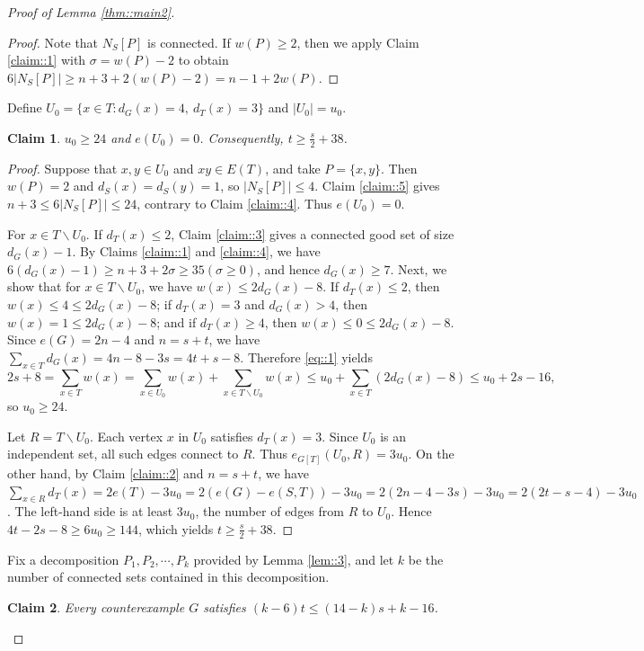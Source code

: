 \documentclass[11pt]{article}
\newtheorem{claim}{Claim}
\theoremstyle{definition}
\begin{document}
\begin{proof}[Proof of Lemma \ref{thm::main2}]
\begin{proof}
    Note that $N_S[P]$ is connected. If $w(P)\geq 2$, then we apply Claim \ref{claim::1} with $\sigma=w(P)-2$ to obtain $6|N_S[P]|\geq n+3+2(w(P)-2)=n-1+2w(P)$.
  \end{proof}

  Define $U_0=\{x\in T:d_G(x)=4,\ d_T(x)=3\}$ and $|U_0|=u_0$.

  \begin{claim}\label{claim::6}
    $u_0\geq 24$ and $e(U_0)=0$.  Consequently, $t\geq \frac{s}{2}+38$.
  \end{claim}


  \begin{proof}
    Suppose that $x,y\in U_0$ and $xy\in E(T)$, and take $P=\{x,y\}$. Then $w(P)=2$ and $d_S(x)=d_S(y)=1$, so $|N_S[P]|\leq 4$. Claim \ref{claim::5} gives $n+3\leq 6|N_S[P]|\leq 24$, contrary to Claim \ref{claim::4}. Thus $e(U_0)=0$.

    For $x\in T\backslash U_0$. If $d_T(x)\leq 2$, Claim \ref{claim::3} gives a connected good set of size $d_G(x)-1$. By Claims \ref{claim::1} and \ref{claim::4}, we have $6(d_G(x)-1)\geq n+3+2\sigma\geq35(\sigma\geq 0)$, and hence $d_G(x)\geq 7$. Next, we show that for $x\in T\backslash U_0$, we have $w(x)\leq 2d_G(x)-8$. If $d_T(x)\leq2$, then $w(x)\leq 4\leq 2d_G(x)-8$; if $d_T(x)=3$ and $d_G(x)>4$, then $w(x)=1\leq2d_G(x)-8$; and if $d_T(x)\geq4$, then $w(x)\leq0\leq2d_G(x)-8$. Since $e(G)=2n-4$ and $n=s+t$, we have $\sum_{x\in T}d_G(x)=4n-8-3s=4t+s-8$. Therefore \eqref{eq::1} yields $$2s+8=\sum_{x\in T}w(x)= \sum_{x\in U_0}w(x)+\sum_{x\in T\backslash U_0}w(x)\leq u_0+\sum_{x\in T}(2d_G(x)-8)\leq u_0+2s-16,$$ so $u_0\geq 24$.

    Let $R=T\backslash U_0$. Each vertex $x$ in \(U_0\) satisfies $d_{T}(x)=3$. Since \(U_0\) is an independent set, all such edges connect to $R$. Thus $e_{G[T]}(U_0,R)=3u_0$. On the other hand,  by Claim \ref{claim::2} and $n=s+t$, we have $\sum_{x\in R}d_{T}(x)=2e(T)-3u_0=2(e(G)-e(S,T))-3u_0=2(2n-4-3s)-3u_0=2(2t-s-4)-3u_0$. The left-hand side is at least \(3u_0\), the number of edges from $R$ to \(U_0\). Hence $4t-2s-8\ge6u_0\ge144$, which yields $t\ge \frac{s}{2}+38$.
  \end{proof}

  Fix a decomposition $P_1,P_2,\cdots,P_k$ provided by Lemma \ref{lem::3}, and let $k$ be the number of connected sets contained in this decomposition.

  \begin{claim}\label{claim::7}
    Every counterexample $G$ satisfies $(k-6)t\le(14-k)s+k-16$.
  \end{claim}



\end{proof}
\end{document}
